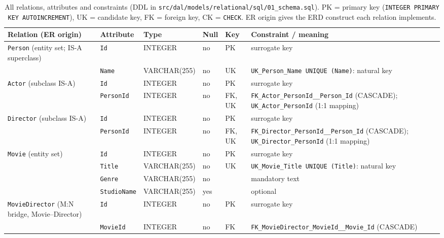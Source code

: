 \documentclass[sigconf,nonacm]{acmart}
\newcommand{\tn}[1]{\texttt{#1}}
\begin{document}
\clearpage
\begin{table}[p]
\caption{All relations, attributes and constraints (DDL in \tn{src/dal/models/relational/sql/01\_schema.sql}). PK = primary key
(\tn{INTEGER PRIMARY KEY AUTOINCREMENT}), UK = candidate key, FK = foreign key, CK = \tn{CHECK}. ER origin gives the ERD construct each relation implements.}
\label{tab:schema}
\small\renewcommand{\arraystretch}{1.45}\setlength{\tabcolsep}{3pt}
\begin{tabular}{@{}p{1.0in}p{.8in}p{.9in}p{.35in}p{.45in}>{\raggedright\arraybackslash}p{3.0in}@{}}\toprule
\textbf{Relation (ER origin)} & \textbf{Attribute} & \textbf{Type} & \textbf{Null} & \textbf{Key} & \textbf{Constraint / meaning}\\\midrule
\tn{Person} (entity set; IS-A superclass) & \tn{Id} & INTEGER & no & PK & surrogate key\\
 & \tn{Name} & VARCHAR(255) & no & UK & \tn{UK\_\allowbreak Person\_\allowbreak Name UNIQUE (Name)}: natural key\\\midrule
\tn{Actor} (subclass IS-A) & \tn{Id} & INTEGER & no & PK & surrogate key\\
 & \tn{PersonId} & INTEGER & no & FK, UK & \tn{FK\_\allowbreak Actor\_\allowbreak PersonId\_\allowbreak 2\_\allowbreak Person\_\allowbreak Id} (CASCADE); \tn{UK\_\allowbreak Actor\_\allowbreak PersonId} (1:1 mapping)\\\midrule
\tn{Director} (subclass IS-A) & \tn{Id} & INTEGER & no & PK & surrogate key\\
 & \tn{PersonId} & INTEGER & no & FK, UK & \tn{FK\_\allowbreak Director\_\allowbreak PersonId\_\allowbreak 2\_\allowbreak Person\_\allowbreak Id} (CASCADE); \tn{UK\_\allowbreak Director\_\allowbreak PersonId} (1:1 mapping)\\\midrule
\tn{Movie} (entity set) & \tn{Id} & INTEGER & no & PK & surrogate key\\
 & \tn{Title} & VARCHAR(255) & no & UK & \tn{UK\_\allowbreak Movie\_\allowbreak Title UNIQUE (Title)}: natural key\\
 & \tn{Genre} & VARCHAR(255) & no & & mandatory text\\
 & \tn{StudioName} & VARCHAR(255) & yes & & optional\\\midrule
\tn{MovieDirector} (M:N bridge, Movie--Director) & \tn{Id} & INTEGER & no & PK & surrogate key\\
 & \tn{MovieId} & INTEGER & no & FK & \tn{FK\_\allowbreak MovieDirector\_\allowbreak MovieId\_\allowbreak 2\_\allowbreak Movie\_\allowbreak Id} (CASCADE)\\

\end{tabular}
\end{table}
\end{document}
